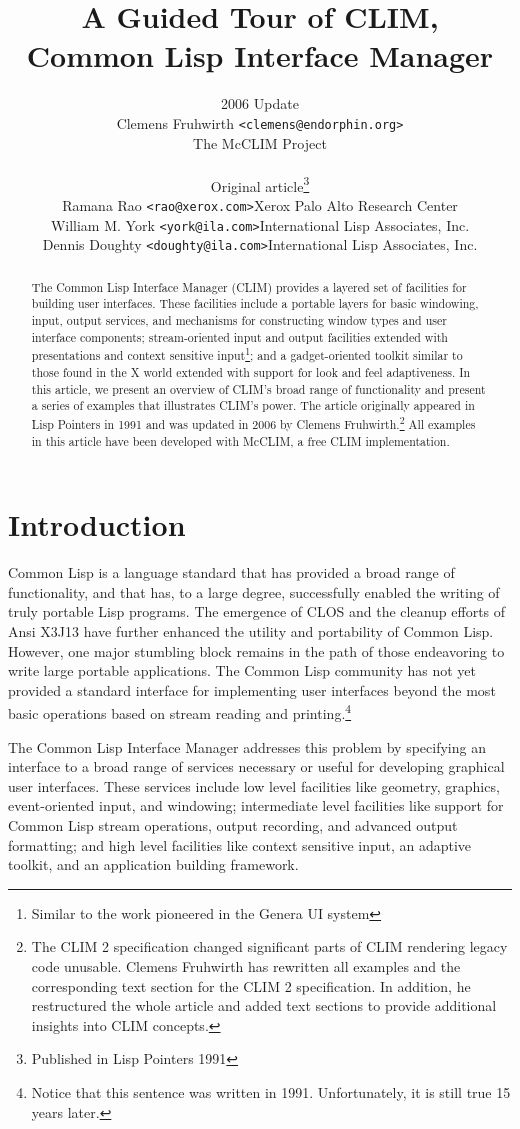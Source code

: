 \documentclass[twocolumn,a4paper]{article}
\title{\Huge A Guided Tour of CLIM, \\ Common Lisp Interface Manager}
\author{
2006 Update \\ 
Clemens Fruhwirth \texttt{<clemens@endorphin.org>} \\ The McCLIM Project 
\bigskip \\
\begin{tabular}{ll}
\multicolumn{2}{c}{Original article\footnote{Published in Lisp Pointers 1991}} \\ 
Ramana Rao \texttt{<rao@xerox.com>} &  Xerox Palo Alto Research Center \\
William M. York \texttt{<york@ila.com>} & International Lisp Associates, Inc. \\
Dennis Doughty \texttt{<doughty@ila.com>} &  International Lisp Associates, Inc. 
\end{tabular}
}
\newcommand {\CLIM}{{\small CLIM}}
\begin{document}
\maketitle
\begin{abstract}
\noindent The Common Lisp Interface Manager (\CLIM{}) provides a
layered set of facilities for building user interfaces. These
facilities include a portable layers for basic windowing, input,
output services, and mechanisms for constructing window types and user
interface components; stream-oriented input and output facilities
extended with presentations and context sensitive
input\footnote{Similar to the work pioneered in the Genera UI system};
and a gadget-oriented toolkit similar to those found in the X world
extended with support for look and feel adaptiveness. In this article,
we present an overview of \CLIM{}'s broad range of functionality and
present a series of examples that illustrates \CLIM{}'s power. The
article originally appeared in Lisp Pointers in 1991 and was updated
in 2006 by Clemens Fruhwirth.\footnote{The CLIM 2 specification
  changed significant parts of \CLIM{} rendering legacy code
  unusable. Clemens Fruhwirth has rewritten all examples and the
  corresponding text section for the \CLIM{} 2 specification. In
  addition, he restructured the whole article and added text sections
  to provide additional insights into \CLIM{} concepts.} All examples
in this article have been developed with McCLIM{}\cite{mcclim}, a free
\CLIM{} implementation.
\end{abstract}

\section*{Introduction}
Common Lisp is a language standard that has provided a broad range of
functionality, and that has, to a large degree, successfully enabled
the writing of truly portable Lisp programs. The emergence of CLOS and
the cleanup efforts of Ansi X3J13 have further enhanced the utility
and portability of Common Lisp. However, one major stumbling block
remains in the path of those endeavoring to write large portable
applications. The Common Lisp community has not yet provided a
standard interface for implementing user interfaces beyond the most
basic operations based on stream reading and printing.\footnote{Notice
  that this sentence was written in 1991. Unfortunately, it is still
  true 15 years later.}

The Common Lisp Interface Manager addresses this problem by specifying
an interface to a broad range of services necessary or useful for
developing graphical user interfaces. These services include low level
facilities like geometry, graphics, event-oriented input, and
windowing; intermediate level facilities like support for Common Lisp
stream operations, output recording, and advanced output formatting;
and high level facilities like context sensitive input, an adaptive
toolkit, and an application building framework.
\end{document}
